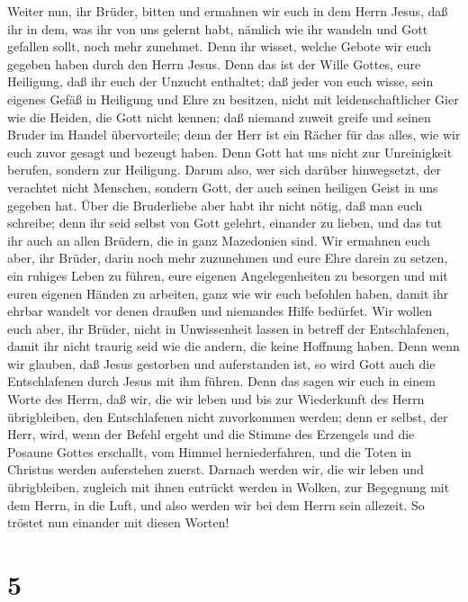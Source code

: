 Weiter nun, ihr Brüder, bitten und ermahnen wir euch in
dem Herrn Jesus, daß ihr in dem, was ihr von uns gelernt habt, nämlich
wie ihr wandeln und Gott gefallen sollt, noch mehr zunehmet.
 Denn ihr wisset, welche Gebote wir euch gegeben haben
durch den Herrn Jesus.  Denn das ist der Wille Gottes,
eure Heiligung, daß ihr euch der Unzucht enthaltet;  daß
jeder von euch wisse, sein eigenes Gefäß in Heiligung und Ehre zu
besitzen,  nicht mit leidenschaftlicher Gier wie die
Heiden, die Gott nicht kennen;  daß niemand zuweit greife
und seinen Bruder im Handel übervorteile; denn der Herr ist ein Rächer
für das alles, wie wir euch zuvor gesagt und bezeugt haben.
 Denn Gott hat uns nicht zur Unreinigkeit berufen, sondern
zur Heiligung.  Darum also, wer sich darüber hinwegsetzt,
der verachtet nicht Menschen, sondern Gott, der auch seinen heiligen
Geist in uns gegeben hat.  Über die Bruderliebe aber habt
ihr nicht nötig, daß man euch schreibe; denn ihr seid selbst von Gott
gelehrt, einander zu lieben,  und das tut ihr auch an
allen Brüdern, die in ganz Mazedonien sind. Wir ermahnen euch aber, ihr
Brüder, darin noch mehr zuzunehmen  und eure Ehre darein
zu setzen, ein ruhiges Leben zu führen, eure eigenen Angelegenheiten zu
besorgen und mit euren eigenen Händen zu arbeiten, ganz wie wir euch
befohlen haben,  damit ihr ehrbar wandelt vor denen
draußen und niemandes Hilfe bedürfet.  Wir wollen euch
aber, ihr Brüder, nicht in Unwissenheit lassen in betreff der
Entschlafenen, damit ihr nicht traurig seid wie die andern, die keine
Hoffnung haben.  Denn wenn wir glauben, daß Jesus
gestorben und auferstanden ist, so wird Gott auch die Entschlafenen
durch Jesus mit ihm führen.  Denn das sagen wir euch in
einem Worte des Herrn, daß wir, die wir leben und bis zur Wiederkunft
des Herrn übrigbleiben, den Entschlafenen nicht zuvorkommen werden;
 denn er selbst, der Herr, wird, wenn der Befehl ergeht
und die Stimme des Erzengels und die Posaune Gottes erschallt, vom
Himmel herniederfahren, und die Toten in Christus werden auferstehen
zuerst.  Darnach werden wir, die wir leben und
übrigbleiben, zugleich mit ihnen entrückt werden in Wolken, zur
Begegnung mit dem Herrn, in die Luft, und also werden wir bei dem Herrn
sein allezeit.  So tröstet nun einander mit diesen
Worten!

\hypertarget{section-4}{%
\section{5}\label{section-4}}

